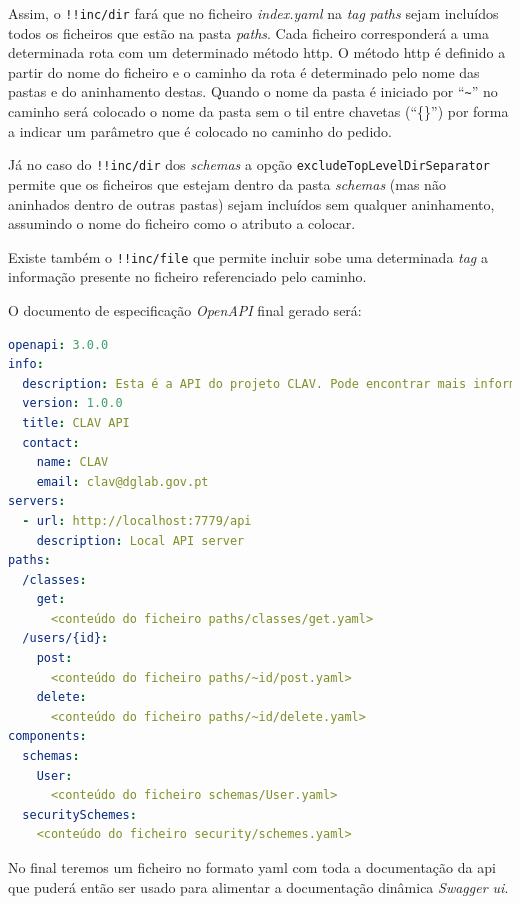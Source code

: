 Assim, o \texttt{!!inc/dir} fará que no ficheiro \textit{index.yaml} na \textit{tag} \textit{paths} sejam incluídos todos os ficheiros que estão na pasta \textit{paths}. Cada ficheiro corresponderá a uma determinada rota com um determinado método \acrshort{http}. O método \acrshort{http} é definido a partir do nome do ficheiro e o caminho da rota é determinado pelo nome das pastas e do aninhamento destas. Quando o nome da pasta é iniciado por ``\verb|~|'' no caminho será colocado o nome da pasta sem o til entre chavetas (``\{\}'') por forma a indicar um parâmetro que é colocado no caminho do pedido.

Já no caso do \texttt{!!inc/dir} dos \textit{schemas} a opção \texttt{excludeTopLevelDirSeparator} permite que os ficheiros que estejam dentro da pasta \textit{schemas} (mas não aninhados dentro de outras pastas) sejam incluídos sem qualquer aninhamento, assumindo o nome do ficheiro como o atributo a colocar.

Existe também o \texttt{!!inc/file} que permite incluir sobe uma determinada \textit{tag} a informação presente no ficheiro referenciado pelo caminho.

O documento de especificação \textit{OpenAPI} final gerado será:
\begin{lstlisting}[language=yaml, caption=Documento de especificação \textit{OpenAPI} gerado a partir do ficheiro \textit{index.yaml} com o uso da \textit{package} \texttt{yaml-include}, label=exem:yamlif]
openapi: 3.0.0
info:
  description: Esta é a API do projeto CLAV. Pode encontrar mais informação sobre o CLAV em [http://clav.dglab.gov.pt](http://clav.dglab.gov.pt).
  version: 1.0.0
  title: CLAV API
  contact:
    name: CLAV
    email: clav@dglab.gov.pt
servers:
  - url: http://localhost:7779/api
    description: Local API server
paths:
  /classes:
    get:
      <conteúdo do ficheiro paths/classes/get.yaml>
  /users/{id}:
    post:
      <conteúdo do ficheiro paths/~id/post.yaml>
    delete:
      <conteúdo do ficheiro paths/~id/delete.yaml>
components:
  schemas:
    User:
      <conteúdo do ficheiro schemas/User.yaml>
  securitySchemes:
    <conteúdo do ficheiro security/schemes.yaml>
\end{lstlisting}

No final teremos um ficheiro no formato \acrshort{yaml} com toda a documentação da \acrshort{api} que puderá então ser usado para alimentar a documentação dinâmica \textit{Swagger \acrshort{ui}}.


